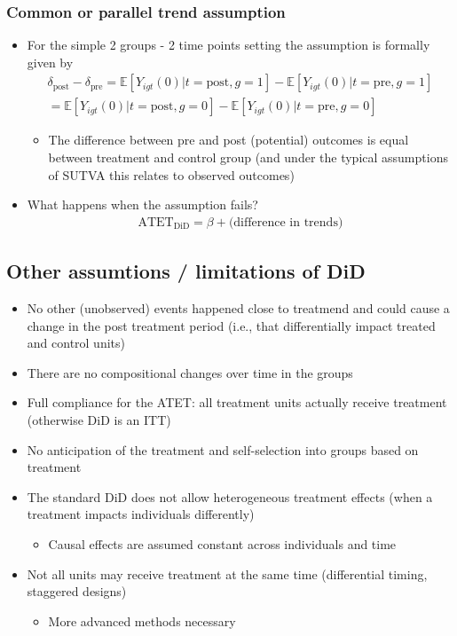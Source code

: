 \documentclass[10pt]{article}
\begin{document}
\subsubsection{Common or parallel trend assumption}
\begin{itemize}
    \item For the simple 2 groups - 2 time points setting the assumption is formally given by 
    \begin{gather*}
        \delta_{\text{post}} - \delta_{\text{pre}} = \mathbb{E}[Y_{igt}(0)|t = \text{post}, g = 1] - \mathbb{E}[Y_{igt}(0)|t = \text{pre}, g = 1] \\
        = \mathbb{E}[Y_{igt}(0)|t = \text{post}, g = 0] - \mathbb{E}[Y_{igt}(0)|t = \text{pre}, g = 0]
    \end{gather*}
    \begin{itemize}
        \item The difference between pre and post (potential) outcomes is equal between treatment and control group (and under the typical assumptions of SUTVA this relates to observed outcomes)
    \end{itemize}
    \item What happens when the assumption fails?
    \begin{gather*}
        \text{ATET}_{\text{DiD}} = \beta + \text{(difference in trends)}
    \end{gather*}
\end{itemize}
\subsection{Other assumtions / limitations of DiD}
\begin{itemize}
    \item No other (unobserved) events happened close to treatmend and could cause a change in the post treatment period (i.e., that differentially impact treated and control units)
    \item There are no compositional changes over time in the groups 
    \item Full compliance for the ATET: all treatment units actually receive treatment (otherwise DiD is an ITT)
    \item No anticipation of the treatment and self-selection into groups based on treatment 
    \item The standard DiD does not allow heterogeneous treatment effects (when a treatment impacts individuals differently)
    \begin{itemize}
        \item Causal effects are assumed constant across individuals and time 
    \end{itemize}
    \item Not all units may receive treatment at the same time (differential timing, staggered designs)
    \begin{itemize}
        \item More advanced methods necessary
    \end{itemize}
\end{itemize}
\newpage 
\end{document}
